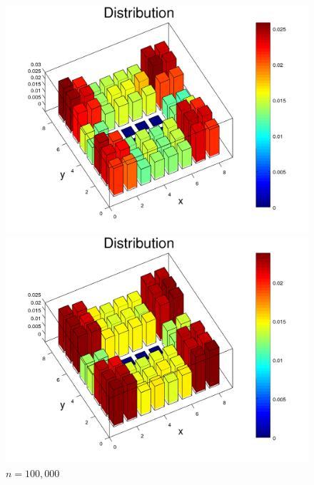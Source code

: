 \documentclass{amsart}
\numberwithin{equation}{section}
\begin{document}
\begin{figure}[!h]
\begin{minipage}{0.50\textwidth}
     \centering
     \includegraphics[width=1.0\linewidth]{figures/withHole/figure_Rook_path_n10000.png}
     \captionsetup{labelformat=empty}
     \caption*{$n=10,000$}
    \end{minipage}\hfil
    \begin{minipage}{0.50\textwidth}
     \centering
     \includegraphics[width=1.0\linewidth]{figures/withHole/figure_Rook_path_n100000.png}
     \captionsetup{labelformat=empty}
     \caption*{$n=100,000$}
   \end{minipage}\hfill
   \begin{minipage}{0.50\textwidth}
     \centering

\end{minipage}
\end{figure}
\end{document}
